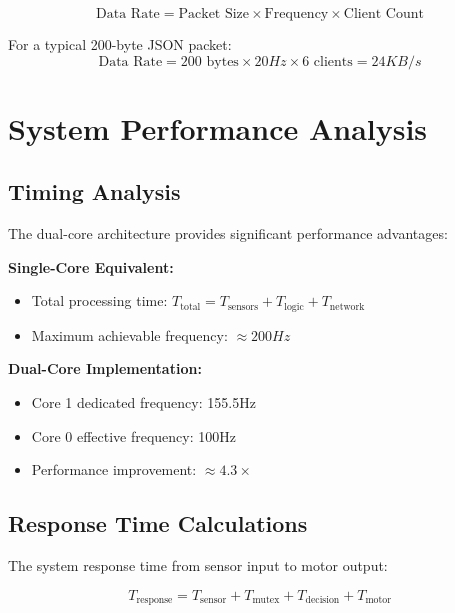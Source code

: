 \documentclass[12pt,a4paper]{article}
\begin{document}
\begin{equation}
\text{Data Rate} = \text{Packet Size} \times \text{Frequency} \times \text{Client Count}
\end{equation}

For a typical 200-byte JSON packet:
\begin{equation}
\text{Data Rate} = 200 \text{ bytes} \times 20Hz \times 6 \text{ clients} = 24KB/s
\end{equation}

\section{System Performance Analysis}

\subsection{Timing Analysis}

The dual-core architecture provides significant performance advantages:

\begin{tcolorbox}[colback=yellow!5!white,colframe=yellow!75!black,title=Performance Metrics]
\textbf{Single-Core Equivalent:}
\begin{itemize}
    \item Total processing time: $T_{\text{total}} = T_{\text{sensors}} + T_{\text{logic}} + T_{\text{network}}$
    \item Maximum achievable frequency: $\approx 200Hz$
\end{itemize}

\textbf{Dual-Core Implementation:}
\begin{itemize}
    \item Core 1 dedicated frequency: 155.5Hz
    \item Core 0 effective frequency: 100Hz
    \item Performance improvement: $\approx 4.3\times$
\end{itemize}
\end{tcolorbox}

\subsection{Response Time Calculations}

The system response time from sensor input to motor output:

\begin{equation}
T_{\text{response}} = T_{\text{sensor}} + T_{\text{mutex}} + T_{\text{decision}} + T_{\text{motor}}
\end{equation}
\end{document}
